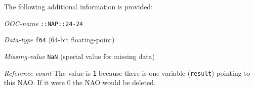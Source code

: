   

The following additional information is provided:
  \begin{bullets}
    \item 
    \emph{OOC-name} 
    \texttt{::NAP::24-24}
    \item 
    \emph{Data-type} 
    \texttt{f64} (64-bit floating-point)
    \item 
    \emph{Missing-value} 
    \texttt{NaN} (special value for missing data)
    \item 
    \emph{Reference-count} The value is 
    \texttt{1} because there is one variable (\texttt{result}) pointing to this NAO.
    If it were 0 the NAO would be deleted.
  \end{bullets}
